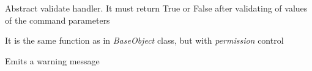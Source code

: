 \documentclass[letterpaper,10pt,english]{sphinxmanual}
\begin{document}
\begin{fulllineitems}
\begin{fulllineitems}
\end{fulllineitems}


\begin{fulllineitems}
\label{command:pyfrid.core.command.BaseCommand.validate}
Abstract validate handler. It must return True or False after validating of values of the command parameters

\end{fulllineitems}


\begin{fulllineitems}
\label{command:pyfrid.core.command.BaseCommand.validate_setting}
It is the same function as in \emph{BaseObject} class, but with \emph{permission} control

\end{fulllineitems}


\begin{fulllineitems}
\label{command:pyfrid.core.command.BaseCommand.warning}
Emits a warning message

\end{fulllineitems}


\end{fulllineitems}

\end{document}
